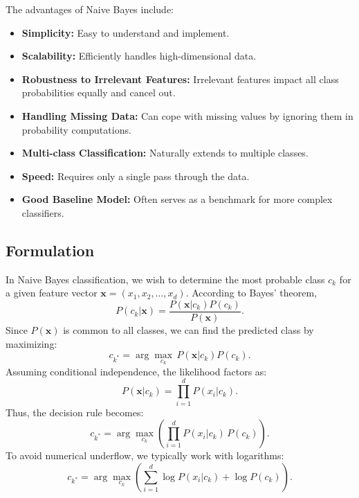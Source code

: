 \documentclass[12pt]{article}
\begin{document}
The advantages of Naive Bayes include:
\begin{itemize}
  \item \textbf{Simplicity:} Easy to understand and implement.
  \item \textbf{Scalability:} Efficiently handles high-dimensional data.
  \item \textbf{Robustness to Irrelevant Features:} Irrelevant features impact all class probabilities equally and cancel out.
  \item \textbf{Handling Missing Data:} Can cope with missing values by ignoring them in probability computations.
  \item \textbf{Multi-class Classification:} Naturally extends to multiple classes.
  \item \textbf{Speed:} Requires only a single pass through the data.
  \item \textbf{Good Baseline Model:} Often serves as a benchmark for more complex classifiers.
\end{itemize}

\subsection{Formulation}
In Naive Bayes classification, we wish to determine the most probable class \(c_k\) for a given feature vector \(\bm{x} = (x_1, x_2, \dots, x_d)\). According to Bayes' theorem,
\begin{equation}
P(c_k|\bm{x}) = \frac{P(\bm{x}|c_k) P(c_k)}{P(\bm{x})}.
\end{equation}
Since \(P(\bm{x})\) is common to all classes, we can find the predicted class by maximizing:
\begin{equation}
c_{k^*} = \arg\max_{c_k} \, P(\bm{x}|c_k) P(c_k).
\end{equation}
Assuming conditional independence, the likelihood factors as:
\begin{equation}
P(\bm{x}|c_k) = \prod_{i=1}^{d} P(x_i|c_k).
\end{equation}
Thus, the decision rule becomes:
\begin{equation}
c_{k^*} = \arg\max_{c_k} \left( \prod_{i=1}^{d} P(x_i|c_k) \, P(c_k) \right).
\end{equation}
To avoid numerical underflow, we typically work with logarithms:
\begin{equation}
c_{k^*} = \arg\max_{c_k} \left( \sum_{i=1}^{d} \log P(x_i|c_k) + \log P(c_k) \right).
\end{equation}
\end{document}
